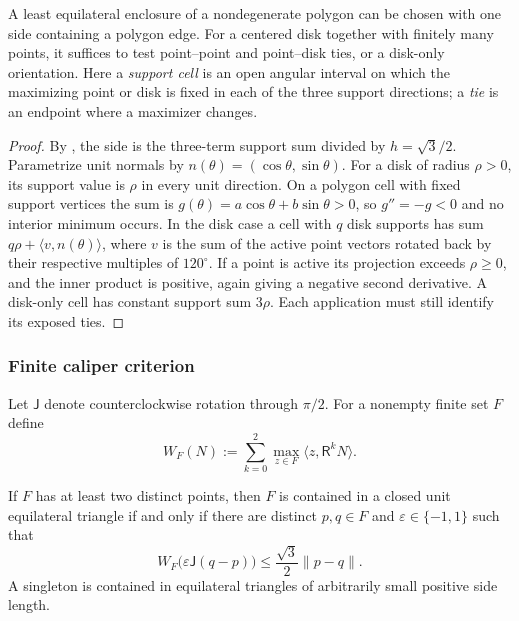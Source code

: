 \begin{lemma}
\label{lem:support-cell-rotation}
A least equilateral enclosure of a nondegenerate polygon can be chosen
with one side containing a polygon edge. For a centered disk together
with finitely many points, it suffices to test point--point and point--disk
ties, or a disk-only orientation. Here a \emph{support cell} is an open
angular interval on which the maximizing point or disk is fixed in each
of the three support directions; a \emph{tie} is an endpoint where a
maximizer changes.
\end{lemma}
\begin{proof}
By , the side is the three-term support
sum divided by $h=\sqrt3/2$. Parametrize unit normals by
$n(\theta)=(\cos\theta,\sin\theta)$. For a disk of radius $\rho>0$, its
support value is $\rho$ in every unit direction. On a polygon cell with fixed support vertices the sum
is $g(\theta)=a\cos\theta+b\sin\theta>0$, so $g''=-g<0$ and no
interior minimum occurs. In the disk case a cell with $q$ disk supports
has sum $q\rho+\langle v,n(\theta)\rangle$, where $v$ is the sum
of the active point vectors rotated back by their respective multiples
of $120^\circ$. If a point is active its
projection exceeds $\rho\ge0$, and the inner product is positive, again
giving a negative second derivative. A disk-only cell has constant support sum $3\rho$. Each application must still identify its exposed ties.
\end{proof}

\subsubsection{Finite caliper criterion}
\label{subsec:finite-caliper}

Let $\mathsf J$ denote counterclockwise rotation through $\pi/2$.  For a
nonempty finite set $F$ define
\begin{equation}
 W_F(N):=\sum_{k=0}^2\max_{z\in F}
 \langle z,\mathsf R^kN\rangle.
 \label{eq:caliper-support-sum}
\end{equation}

\begin{theorem}
\label{thm:cert-caliper}
If $F$ has at least two distinct points, then $F$ is contained in a closed
unit equilateral triangle if and only if there are distinct $p,q\in F$ and
$\varepsilon\in\{-1,1\}$ such that
\begin{equation}
 W_F\bigl(\varepsilon\mathsf J(q-p)\bigr)
 \le\frac{\sqrt3}{2}\lVert p-q\rVert.
 \label{eq:finite-caliper-test}
\end{equation}
A singleton is contained in equilateral triangles of arbitrarily small
positive side length.
\end{theorem}

